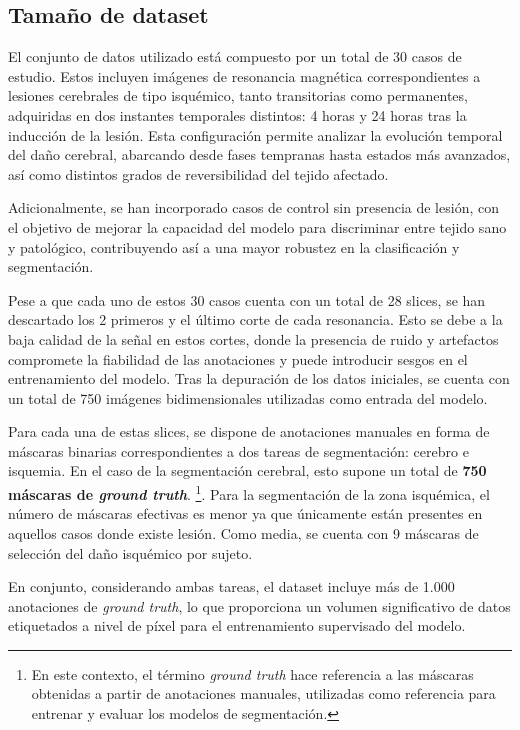 \subsection{Tamaño de dataset}
El conjunto de datos utilizado está compuesto por un total de 30 casos de estudio. Estos incluyen imágenes de resonancia magnética correspondientes a lesiones cerebrales de tipo isquémico, tanto transitorias como permanentes, adquiridas en dos instantes temporales distintos: 4 horas y 24 horas tras la inducción de la lesión. Esta configuración permite analizar la evolución temporal del daño cerebral, abarcando desde fases tempranas hasta estados más avanzados, así como distintos grados de reversibilidad del tejido afectado. \citep{pradillo2022ictus}

Adicionalmente, se han incorporado casos de control sin presencia de lesión, con el objetivo de mejorar la capacidad del modelo para discriminar entre tejido sano y patológico, contribuyendo así a una mayor robustez en la clasificación y segmentación.

Pese a que cada uno de estos 30 casos cuenta con un total de 28 slices, se han descartado los 2 primeros y el último corte de cada resonancia. Esto se debe a la baja calidad de la señal en estos cortes, donde la presencia de ruido y artefactos compromete la fiabilidad de las anotaciones y puede introducir sesgos en el entrenamiento del modelo.
Tras la depuración de los datos iniciales, se cuenta con un total de 750 imágenes bidimensionales utilizadas como entrada del modelo.

Para cada una de estas slices, se dispone de anotaciones manuales en forma de máscaras binarias correspondientes a dos tareas de segmentación: cerebro e isquemia. En el caso de la segmentación cerebral, esto supone un total de\textbf{ 750 máscaras de \textit{ground truth}}.
\footnote{En este contexto, el término \textit{ground truth} hace referencia a las máscaras obtenidas a partir de anotaciones manuales, utilizadas como referencia para entrenar y evaluar los modelos de segmentación.}.
Para la segmentación de la zona isquémica, el número de máscaras efectivas es menor ya que únicamente están presentes en aquellos casos donde existe lesión. Como media, se cuenta con 9 máscaras de selección del daño isquémico por sujeto.

En conjunto, considerando ambas tareas, el dataset incluye más de 1.000 anotaciones de \textit{ground truth}, lo que proporciona un volumen significativo de datos etiquetados a nivel de píxel para el entrenamiento supervisado del modelo.

